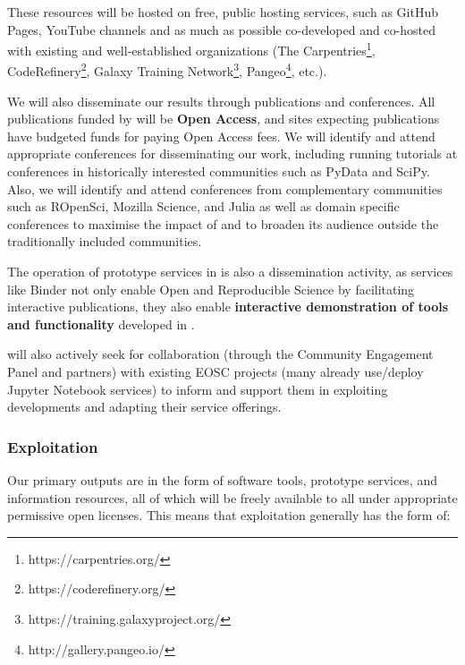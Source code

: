 These resources will be hosted on free, public hosting services,
such as GitHub Pages, YouTube channels and as much as possible co-developed and co-hosted with existing and
well-established organizations
(The Carpentries\footnote{https://carpentries.org/}, CodeRefinery\footnote{https://coderefinery.org/},
Galaxy Training Network\footnote{https://training.galaxyproject.org/}, Pangeo\footnote{http://gallery.pangeo.io/}, etc.).

We will also disseminate our results through publications and conferences.
All publications funded by \TheProject will be \textbf{Open Access},
and sites expecting publications have budgeted funds for paying Open Access fees.
We will identify and attend appropriate conferences for disseminating our work,
including running tutorials at conferences in historically interested communities such as PyData and SciPy.
Also, we will identify and attend conferences from complementary communities such as ROpenSci,
Mozilla Science, and Julia
as well as domain specific conferences to maximise the impact of \TheProject and to broaden its
audience outside the
traditionally included communities.

The operation of prototype services in  is also a dissemination activity,
as services like Binder not only enable Open and Reproducible Science by facilitating interactive publications,
they also enable \textbf{interactive demonstration of tools and functionality}
developed in \TheProject.

\TheProject will also actively seek for collaboration (through the Community
Engagement Panel and
\TheProject partners) with existing EOSC projects (many already use/deploy
Jupyter Notebook services) to inform and support them in exploiting \TheProject
developments and adapting their service offerings.
\subsubsection{Exploitation}

Our primary outputs are in the form of software tools, prototype services, and information resources,
all of which will be freely available to all under appropriate permissive open licenses.
This means that exploitation generally has the form of:

